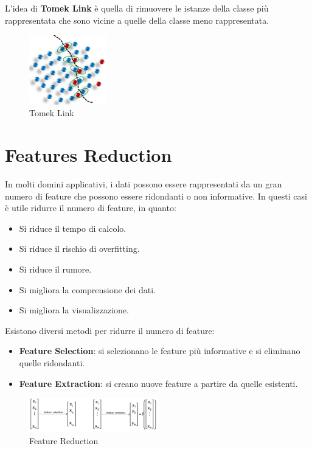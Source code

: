 L'idea di \textbf{Tomek Link} è quella di rimuovere le istanze della classe più
rappresentata che sono vicine a quelle della classe meno rappresentata.
\begin{figure}[!ht]
      \centering
      \includegraphics[width=0.3\textwidth]{./img/Preprocessing/tomek.png}
      \caption{Tomek Link}
      \label{fig:tomeklink}
\end{figure}
\section{Features Reduction}
In molti domini applicativi, i dati possono essere rappresentati da un gran
numero di feature che possono essere ridondanti o non informative. In questi casi
è utile ridurre il numero di feature, in quanto:
\begin{itemize}
      \item Si riduce il tempo di calcolo.
      \item Si riduce il rischio di overfitting.
      \item Si riduce il rumore.
      \item Si migliora la comprensione dei dati.
      \item Si migliora la visualizzazione.
\end{itemize}
Esistono diversi metodi per ridurre il numero di feature:
\begin{itemize}
      \item \textbf{Feature Selection}: si selezionano le feature più informative
            e si eliminano quelle ridondanti.
      \item \textbf{Feature Extraction}: si creano nuove feature a partire da
            quelle esistenti.
\end{itemize}
\begin{figure}
      \centering
      \includegraphics[width=0.5\textwidth]{./img/Preprocessing/features.png}
      \caption{Feature Reduction}
      \label{fig:feature_reduction}
\end{figure}
